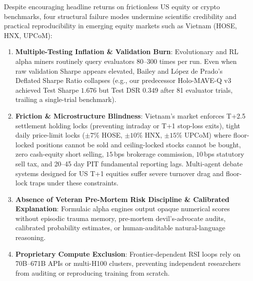 \documentclass[11pt]{article}
\begin{document}
Despite encouraging headline returns on frictionless US equity or crypto benchmarks, four structural failure modes undermine scientific credibility and practical reproducibility in emerging equity markets such as Vietnam (HOSE, HNX, UPCoM):
\begin{enumerate}[leftmargin=1.4em]
  \item \textbf{Multiple-Testing Inflation \& Validation Burn}: Evolutionary and RL alpha miners routinely query evaluators $80$--$300$ times per run. Even when raw validation Sharpe appears elevated, Bailey and L\'opez de Prado's Deflated Sharpe Ratio \citep{bailey2014deflated} collapses (e.g., our predecessor Holo-MAVE-Q v3 achieved Test Sharpe $1.676$ but Test DSR $0.349$ after 81 evaluator trials, trailing a single-trial benchmark).
  \item \textbf{Friction \& Microstructure Blindness}: Vietnam's market enforces T+2.5 settlement holding locks (preventing intraday or T+1 stop-loss exits), tight daily price-limit locks ($\pm 7\%$ HOSE, $\pm 10\%$ HNX, $\pm 15\%$ UPCoM) where floor-locked positions cannot be sold and ceiling-locked stocks cannot be bought, zero cash-equity short selling, $15$\,bps brokerage commission, $10$\,bps statutory sell tax, and 20--45 day PIT fundamental reporting lags. Multi-agent debate systems designed for US T+1 equities suffer severe turnover drag and floor-lock traps under these constraints.
  \item \textbf{Absence of Veteran Pre-Mortem Risk Discipline \& Calibrated Explanation}: Formulaic alpha engines output opaque numerical scores without episodic trauma memory, pre-mortem devil's-advocate audits, calibrated probability estimates, or human-auditable natural-language reasoning.
  \item \textbf{Proprietary Compute Exclusion}: Frontier-dependent RSI loops rely on 70B--671B APIs or multi-H100 clusters, preventing independent researchers from auditing or reproducing training from scratch.
\end{enumerate}
\end{document}
